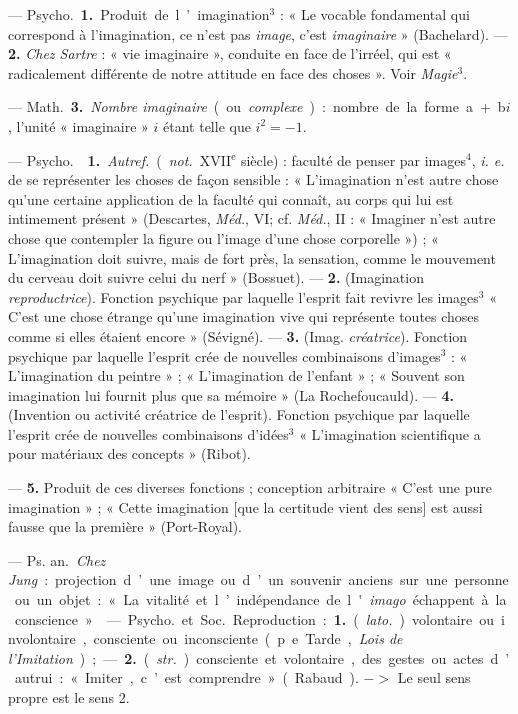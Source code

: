 \begin{itemize}[leftmargin=1cm, label=, itemsep=1pt]
 — \si{Psycho.} {\bf 1.} Produit de l’imagination$^3$ : « Le
vocable fondamental qui correspond à l’imagination, ce n’est pas {\it image},
c’est {\it imaginaire} » (Bachelard). — {\bf 2.} {\it Chez Sartre} : « vie
imaginaire », conduite en face de l’irréel, qui est « radicalement différente
de notre attitude en face des choses ». Voir {\it Magie}$^3$.

— \si{Math.} {\bf 3.} {\it Nombre imaginaire} (ou {\it complexe}) : nombre de
la forme a + b$i$, l'unité « imaginaire » $i$ étant telle que $i^2 = - 1$.

 — \si{Psycho.}  {\bf 1.} {\it Autref.}
({\it not.} {\footnotesize XVII}$^\text{e}$ siècle) : faculté de penser par
images$^4$, {\it i. e.} de se représenter les choses de façon sensible :
« L’imagination n’est autre chose qu’une certaine application de la faculté
qui connaît, au corps qui lui est intimement présent » (Descartes,
{\it Méd.}, VI; cf. {\it Méd.}, II : « Imaginer n'est autre chose que
contempler la figure ou l’image d’une chose corporelle ») ; « L’imagination
doit suivre, mais de fort près, la sensation, comme le mouvement du cerveau
doit suivre celui du nerf » (Bossuet). — {\bf 2.} (Imagination
{\it reproductrice}). Fonction psychique par laquelle l'esprit fait revivre
les images$^3$ « C’est une chose étrange qu’une imagination vive qui
représente toutes choses comme si elles étaient encore » (Sévigné). —
{\bf 3.} (Imag. {\it créatrice}). Fonction psychique par laquelle l'esprit
crée de nouvelles combinaisons d'images$^3$ : « L’imagination du peintre » ;
« L’imagination de l'enfant » ; « Souvent son imagination lui fournit plus
que sa mémoire »
(La Rochefoucauld). —  {\bf 4.} (Invention ou activité créatrice de
l'esprit). Fonction psychique par laquelle l'esprit crée de nouvelles
combinaisons d’idées$^3$ « L’imagination scientifique a pour matériaux des
concepts » (Ribot).

—  {\bf 5.} Produit de ces diverses fonctions ; conception
arbitraire « C’est une pure imagination » ; « Cette imagination [que la
certitude vient des sens] est aussi fausse que la première » (Port-Royal).

 — \si{Ps. an.} {\it Chez Jung} : projection d’une image ou d’un
souvenir anciens sur une personne ou un objet : « La vitalité et
l’indépendance de l'{\it imago} échappent à la conscience. »

 — \si{Psycho.} et \si{Soc.} Reproduction : {\bf 1.}
({\it lato.}) volontaire ou involontaire, consciente ou inconsciente (p. e.
Tarde, {\it Lois de l’Imitation}) ; — {\bf 2.} ({\it str.}) consciente et
volontaire, des gestes ou actes d’autrui : « Imiter, c’est
comprendre » (Rabaud). $->$ Le seul sens propre est le sens 2.


\end{itemize}
